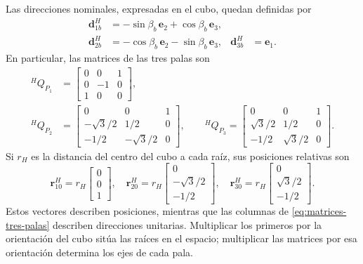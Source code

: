 \documentclass[11pt,a4paper,oneside]{report}
\newcommand{\vct}[1]{\bm{#1}}
\begin{document}
Las direcciones nominales, expresadas en el cubo, quedan definidas por
\begin{align}
 \vct d_{1b}^H&=-\sin\beta_b\,\vct e_2+\cos\beta_b\,\vct e_3,\\
 \vct d_{2b}^H&=-\cos\beta_b\,\vct e_2-\sin\beta_b\,\vct e_3,
 &\vct d_{3b}^H&=\vct e_1.
\end{align}
En particular, las matrices de las tres palas son
\begin{align}
 {}^HQ_{P_1}&=\begin{bmatrix}0&0&1\\0&-1&0\\1&0&0\end{bmatrix},\\
 {}^HQ_{P_2}&=\begin{bmatrix}
 0&0&1\\-\sqrt3/2&1/2&0\\-1/2&-\sqrt3/2&0
 \end{bmatrix},\qquad
 {}^HQ_{P_3}=\begin{bmatrix}
 0&0&1\\\sqrt3/2&1/2&0\\-1/2&\sqrt3/2&0
 \end{bmatrix}.
 \label{eq:matrices-tres-palas}
\end{align}
Si $r_H$ es la distancia del centro del cubo a cada raíz, sus posiciones relativas son
\begin{equation}
 \vct r_{10}^H=r_H\begin{bmatrix}0\\0\\1\end{bmatrix},\quad
 \vct r_{20}^H=r_H\begin{bmatrix}0\\-\sqrt3/2\\-1/2\end{bmatrix},\quad
 \vct r_{30}^H=r_H\begin{bmatrix}0\\\sqrt3/2\\-1/2\end{bmatrix}.
 \label{eq:raices-tres-palas}
\end{equation}
Estos vectores describen posiciones, mientras que las columnas de \eqref{eq:matrices-tres-palas} describen direcciones unitarias. Multiplicar los primeros por la orientación del cubo sitúa las raíces en el espacio; multiplicar las matrices por esa orientación determina los ejes de cada pala.
\end{document}
